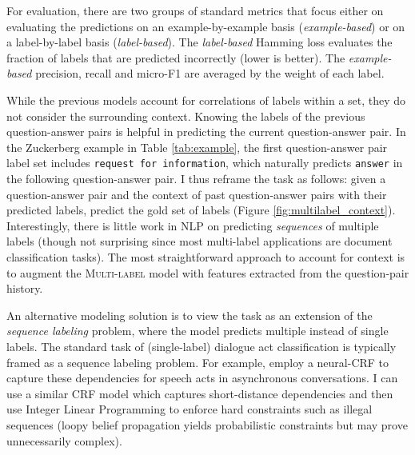 For evaluation, there are two groups of standard metrics that focus either on evaluating the predictions on an example-by-example basis (\emph{example-based}) or on a label-by-label basis (\emph{label-based}). The \emph{label-based} Hamming loss evaluates the fraction of labels that are predicted incorrectly (lower is better). The \emph{example-based} precision, recall and micro-F1 are averaged by the weight of each label. 

 While the previous models account for correlations of labels within a set, they do not consider the surrounding context. Knowing the labels of the previous question-answer pairs is helpful in predicting the current question-answer pair. In the Zuckerberg example in Table \ref{tab:example}, the first question-answer pair label set includes \texttt{request for information}, which naturally predicts \texttt{answer} in the following question-answer pair. I thus reframe the task as follows: given a question-answer pair and the context of past question-answer pairs with their predicted labels, predict the gold set of labels (Figure \ref{fig:multilabel_context}).  Interestingly, there is little work in NLP on predicting \emph{sequences} of multiple labels (though not surprising since most multi-label applications are document classification tasks). The most straightforward approach to account for context is to augment the \textsc{Multi-label} model with features extracted from the question-pair history. 

An alternative modeling solution is to view the task as an extension of the \emph{sequence labeling} problem, where the model predicts multiple instead of single labels. The standard task of (single-label) dialogue act classification is typically framed as a sequence labeling problem. For example, \citet{Joty:2018} employ a neural-CRF to capture these dependencies for speech acts in asynchronous conversations. I can use a similar CRF model which captures short-distance dependencies and then use Integer Linear Programming to enforce hard constraints such as illegal sequences (loopy belief propagation yields probabilistic constraints but may prove unnecessarily complex). 


